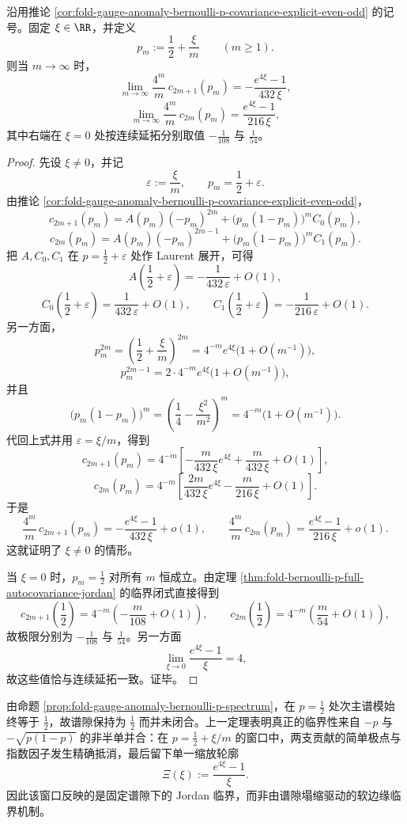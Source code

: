 \begin{theorem}\label{thm:fold-bernoulli-p-jordan-critical-double-parity-scaling}
沿用推论 \ref{cor:fold-gauge-anomaly-bernoulli-p-covariance-explicit-even-odd} 的记号。固定 \(\xi\in\RR\)，并定义
\[
p_m:=\frac12+\frac{\xi}{m}\qquad (m\ge 1).
\]
则当 \(m\to\infty\) 时，
\[
\lim_{m\to\infty}\frac{4^m}{m}\,c_{2m+1}(p_m)
=-\frac{e^{4\xi}-1}{432\,\xi},
\]
\[
\lim_{m\to\infty}\frac{4^m}{m}\,c_{2m}(p_m)
=\frac{e^{4\xi}-1}{216\,\xi},
\]
其中右端在 \(\xi=0\) 处按连续延拓分别取值 \(-\frac1{108}\) 与 \(\frac1{54}\)。
\end{theorem}
\begin{proof}
先设 \(\xi\neq 0\)，并记
\[
\varepsilon:=\frac{\xi}{m},
\qquad
p_m=\frac12+\varepsilon.
\]
由推论 \ref{cor:fold-gauge-anomaly-bernoulli-p-covariance-explicit-even-odd}，
\[
c_{2m+1}(p_m)=A(p_m)(-p_m)^{2m}+\bigl(p_m(1-p_m)\bigr)^m C_0(p_m),
\]
\[
c_{2m}(p_m)=A(p_m)(-p_m)^{2m-1}+\bigl(p_m(1-p_m)\bigr)^m C_1(p_m).
\]
把 \(A,C_0,C_1\) 在 \(p=\frac12+\varepsilon\) 处作 Laurent 展开，可得
\[
A\!\left(\frac12+\varepsilon\right)
=-\frac{1}{432\,\varepsilon}+O(1),
\]
\[
C_0\!\left(\frac12+\varepsilon\right)
=\frac{1}{432\,\varepsilon}+O(1),
\qquad
C_1\!\left(\frac12+\varepsilon\right)
=-\frac{1}{216\,\varepsilon}+O(1).
\]
另一方面，
\[
p_m^{2m}
=\left(\frac12+\frac{\xi}{m}\right)^{2m}
=4^{-m}e^{4\xi}\bigl(1+O(m^{-1})\bigr),
\]
\[
p_m^{2m-1}
=2\cdot 4^{-m}e^{4\xi}\bigl(1+O(m^{-1})\bigr),
\]
并且
\[
\bigl(p_m(1-p_m)\bigr)^m
=\left(\frac14-\frac{\xi^2}{m^2}\right)^m
=4^{-m}\bigl(1+O(m^{-1})\bigr).
\]
代回上式并用 \(\varepsilon=\xi/m\)，得到
\[
c_{2m+1}(p_m)
=4^{-m}\left[
-\frac{m}{432\,\xi}e^{4\xi}
+\frac{m}{432\,\xi}
+O(1)
\right],
\]
\[
c_{2m}(p_m)
=4^{-m}\left[
\frac{2m}{432\,\xi}e^{4\xi}
-\frac{m}{216\,\xi}
+O(1)
\right].
\]
于是
\[
\frac{4^m}{m}\,c_{2m+1}(p_m)
=-\frac{e^{4\xi}-1}{432\,\xi}+o(1),
\qquad
\frac{4^m}{m}\,c_{2m}(p_m)
=\frac{e^{4\xi}-1}{216\,\xi}+o(1).
\]
这就证明了 \(\xi\neq 0\) 的情形。

当 \(\xi=0\) 时，\(p_m=\tfrac12\) 对所有 \(m\) 恒成立。由定理 \ref{thm:fold-bernoulli-p-full-autocovariance-jordan} 的临界闭式直接得到
\[
c_{2m+1}\!\left(\frac12\right)
=4^{-m}\left(-\frac{m}{108}+O(1)\right),
\qquad
c_{2m}\!\left(\frac12\right)
=4^{-m}\left(\frac{m}{54}+O(1)\right),
\]
故极限分别为 \(-\frac1{108}\) 与 \(\frac1{54}\)。另一方面
\[
\lim_{\xi\to 0}\frac{e^{4\xi}-1}{\xi}=4,
\]
故这些值恰与连续延拓一致。证毕。
\end{proof}

\begin{remark}[非半单而不闭隙的临界窗口]\label{rem:fold-bernoulli-p-jordan-critical-finite-gap}
由命题 \ref{prop:fold-gauge-anomaly-bernoulli-p-spectrum}，在 \(p=\tfrac12\) 处次主谱模始终等于 \(\frac12\)，故谱隙保持为 \(\frac12\) 而并未闭合。上一定理表明真正的临界性来自 \(-p\) 与 \(-\sqrt{p(1-p)}\) 的非半单并合：在 \(p=\tfrac12+\xi/m\) 的窗口中，两支贡献的简单极点与指数因子发生精确抵消，最后留下单一缩放轮廓
\[
\Xi(\xi):=\frac{e^{4\xi}-1}{\xi}.
\]
因此该窗口反映的是固定谱隙下的 Jordan 临界，而非由谱隙塌缩驱动的软边缘临界机制。
\end{remark}
